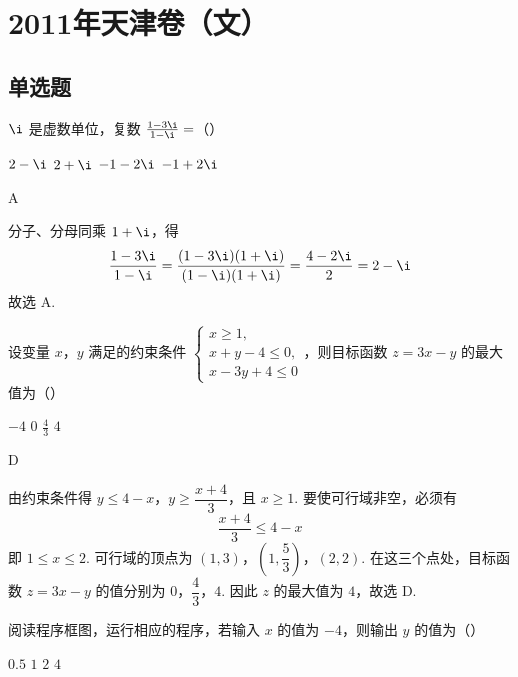 \chapter{2011年天津卷（文）}

\section{单选题}

\begin{problem}
\(\i\) 是虚数单位，复数 \(\frac{1 - 3\i}{1 - \i} =\)（\quad）

\choices
    {\(2 - \i\)}
    {\(2 + \i\)}
    {\(-1 - 2\i\)}
    {\(-1 + 2\i\)}
\end{problem}

\begin{answer}
A
\end{answer}

\begin{solution}
分子、分母同乘 \(1+\i\)，得
\[
\frac{1-3\i}{1-\i}
=\frac{(1-3\i)(1+\i)}{(1-\i)(1+\i)}
=\frac{4-2\i}{2}
=2-\i
\]
故选 A.
\end{solution}

\begin{problem}
设变量 \(x\)，\(y\) 满足的约束条件 \(\begin{cases}
x\geqslant 1,\\
x+y-4\leqslant 0,\\
x-3y+4\leqslant 0
\end{cases}\)，则目标函数 \(z = 3x - y\) 的最大值为（\quad）

\choices
    {\(-4\)}
    {\(0\)}
    {\( \frac{4}{3} \)}
    {\(4\)}
\end{problem}

\begin{answer}
D
\end{answer}

\begin{solution}
由约束条件得 \(y\leqslant4-x\)，\(y\geqslant\dfrac{x+4}{3}\)，且 \(x\geqslant1\). 要使可行域非空，必须有
\[
\frac{x+4}{3}\leqslant4-x
\]
即 \(1\leqslant x\leqslant2\). 可行域的顶点为 \(\left(1,3\right)\)，\(\left(1,\dfrac{5}{3}\right)\)，\((2,2)\). 在这三个点处，目标函数 \(z=3x-y\) 的值分别为 \(0\)，\(\dfrac{4}{3}\)，\(4\). 因此 \(z\) 的最大值为 \(4\)，故选 D.
\end{solution}

\begin{problem}
阅读程序框图，运行相应的程序，若输入 \(x\) 的值为 \(-4\)，则输出 \(y\) 的值为（\quad）


\choices
    {\(0.5\)}
    {\(1\)}
    {\(2\)}
    {\(4\)}
\end{problem}

